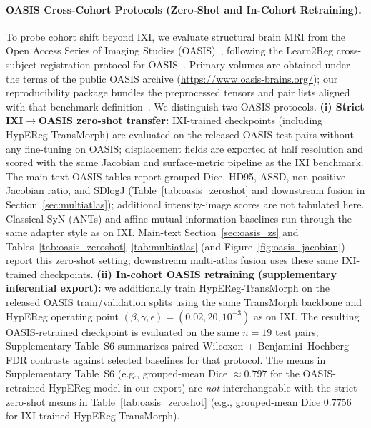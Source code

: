 \documentclass[jimaging,article,submit,pdftex,moreauthors]{Definitions/mdpi}
\begin{document}
\paragraph{OASIS Cross-Cohort Protocols (Zero-Shot and In-Cohort Retraining).}
To probe cohort shift beyond IXI, we evaluate structural brain MRI from the Open Access Series of Imaging Studies (OASIS)~\cite{marcus2007oasis}, following the Learn2Reg cross-subject registration protocol for OASIS~\cite{hering2023learn2reg}. Primary volumes are obtained under the terms of the public OASIS archive (\url{https://www.oasis-brains.org/}); our reproducibility package bundles the preprocessed tensors and pair lists aligned with that benchmark definition~\cite{hering2023learn2reg}. We distinguish two OASIS protocols. \textbf{(i) Strict IXI\(\to\)OASIS zero-shot transfer:} IXI-trained checkpoints (including HypEReg-TransMorph) are evaluated on the released OASIS test pairs without any fine-tuning on OASIS; displacement fields are exported at half resolution and scored with the same Jacobian and surface-metric pipeline as the IXI benchmark. The main-text OASIS tables report grouped Dice, HD95, ASSD, non-positive Jacobian ratio, and SDlogJ (Table~\ref{tab:oasis_zeroshot} and downstream fusion in Section~\ref{sec:multiatlas}); additional intensity-image scores are not tabulated here. Classical SyN (ANTs) and affine mutual-information baselines run through the same adapter style as on IXI. Main-text Section~\ref{sec:oasis_zs} and Tables~\ref{tab:oasis_zeroshot}--\ref{tab:multiatlas} (and Figure~\ref{fig:oasis_jacobian}) report this zero-shot setting; downstream multi-atlas fusion uses these same IXI-trained checkpoints. \textbf{(ii) In-cohort OASIS retraining (supplementary inferential export):} we additionally train HypEReg-TransMorph on the released OASIS train/validation splits using the same TransMorph backbone and HypEReg operating point \((\beta,\gamma,\epsilon)=(0.02,20,10^{-3})\) as on IXI. The resulting OASIS-retrained checkpoint is evaluated on the same \(n{=}19\) test pairs; Supplementary Table~S6 summarizes paired Wilcoxon + Benjamini--Hochberg FDR contrasts against selected baselines for that protocol. The means in Supplementary Table~S6 (e.g., grouped-mean Dice \(\approx 0.797\) for the OASIS-retrained HypEReg model in our export) are \emph{not} interchangeable with the strict zero-shot means in Table~\ref{tab:oasis_zeroshot} (e.g., grouped-mean Dice \(0.7756\) for IXI-trained HypEReg-TransMorph).
\end{document}
